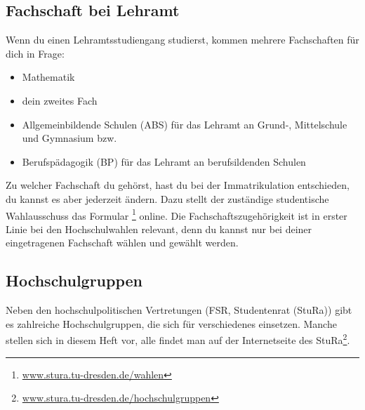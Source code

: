 \documentclass{scrartcl}
\begin{document}
\subsection*{Fachschaft bei Lehramt}
\label{sub:fachschaft_bei_lehramt}
Wenn du einen Lehramtsstudiengang studierst, kommen mehrere Fachschaften für dich in Frage:
\begin{itemize}
  \item Mathematik
  \item dein zweites Fach
  \item Allgemeinbildende Schulen (ABS) für das Lehramt an Grund-, Mittelschule und Gymnasium bzw.
  \item Berufspädagogik (BP) für das Lehramt an berufsildenden Schulen 
\end{itemize}
Zu welcher Fachschaft du gehörst, hast du bei der Immatrikulation entschieden,
du kannst es aber jederzeit ändern.
Dazu stellt der zuständige studentische Wahlausschuss das Formular
\footnote{\url{www.stura.tu-dresden.de/wahlen}} online.
  Die Fachschaftszugehörigkeit ist in erster Linie bei den Hochschulwahlen relevant,
  denn du kannst nur bei deiner eingetragenen Fachschaft wählen und gewählt werden.

\subsection*{Hochschulgruppen}
\label{sub:hochschulgruppen}
Neben den hochschulpolitischen Vertretungen (FSR, Studentenrat (StuRa)) gibt es zahlreiche Hochschulgruppen,
die sich für verschiedenes einsetzen. Manche stellen sich in diesem Heft vor,
alle findet man auf der Internetseite des StuRa\footnote{\url{www.stura.tu-dresden.de/hochschulgruppen}}.
\end{document}
